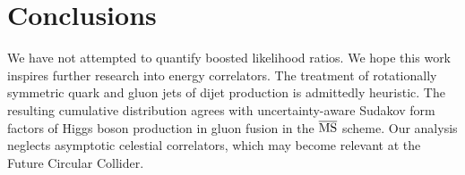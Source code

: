 \section{Conclusions}\label{sec:conclusions}

We have not attempted to quantify boosted likelihood ratios. We hope
this work inspires further research into energy correlators. The
treatment of rotationally symmetric quark and gluon jets of dijet
production is admittedly heuristic. The resulting cumulative
distribution agrees with uncertainty-aware Sudakov form factors of Higgs
boson production in gluon fusion in the $\overline{\rm MS}$ scheme. Our
analysis neglects asymptotic celestial correlators, which may become
relevant at the Future Circular Collider.

